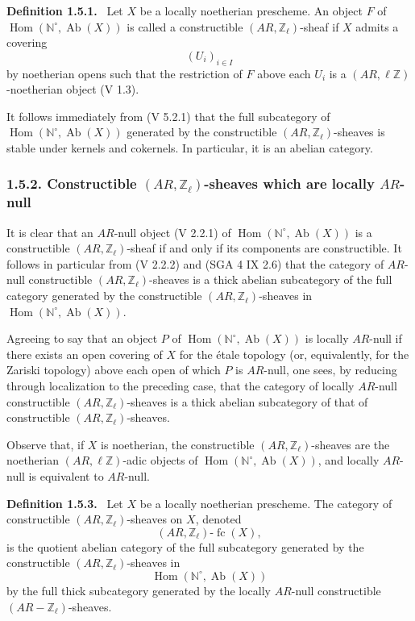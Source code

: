 \documentclass[11pt]{article}
\newenvironment{statement}[1]{\par\medskip\noindent\textbf{#1.}\ }{\par\medskip}
\DeclareMathOperator{\Hom}{Hom}
\providecommand{\Hom}{\operatorname{Hom}}
\providecommand{\Ab}{\operatorname{Ab}}
\providecommand{\fc}{\operatorname{fc}}
\providecommand{\Ab}{\operatorname{Ab}}
\begin{document}
\begin{statement}{Definition 1.5.1}
Let \(X\) be a locally noetherian prescheme. An object \(F\) of \(\Hom(\mathbb N^\circ,\Ab(X))\) is called a constructible \((AR,\mathbb Z_\ell)\)-sheaf if \(X\) admits a covering
\[
(U_i)_{i\in I}
\]
by noetherian opens such that the restriction of \(F\) above each \(U_i\) is a \((AR,\ell\mathbb Z)\)-noetherian object (V 1.3).
\end{statement}

It follows immediately from (V 5.2.1) that the full subcategory of \(\Hom(\mathbb N^\circ,\Ab(X))\) generated by the constructible \((AR,\mathbb Z_\ell)\)-sheaves is stable under kernels and cokernels. In particular, it is an abelian category.

\subsubsection*{1.5.2. Constructible \((AR,\mathbb Z_\ell)\)-sheaves which are locally \(AR\)-null}

It is clear that an \(AR\)-null object (V 2.2.1) of \(\Hom(\mathbb N^\circ,\Ab(X))\) is a constructible \((AR,\mathbb Z_\ell)\)-sheaf if and only if its components are constructible. It follows in particular from (V 2.2.2) and (SGA 4 IX 2.6) that the category of \(AR\)-null constructible \((AR,\mathbb Z_\ell)\)-sheaves is a thick abelian subcategory of the full category generated by the constructible \((AR,\mathbb Z_\ell)\)-sheaves in \(\Hom(\mathbb N^\circ,\Ab(X))\).

Agreeing to say that an object \(P\) of \(\Hom(\mathbb N^\circ,\Ab(X))\) is locally \(AR\)-null if there exists an open covering of \(X\) for the étale topology (or, equivalently, for the Zariski topology) above each open of which \(P\) is \(AR\)-null, one sees, by reducing through localization to the preceding case, that the category of locally \(AR\)-null constructible \((AR,\mathbb Z_\ell)\)-sheaves is a thick abelian subcategory of that of constructible \((AR,\mathbb Z_\ell)\)-sheaves.

Observe that, if \(X\) is noetherian, the constructible \((AR,\mathbb Z_\ell)\)-sheaves are the noetherian \((AR,\ell\mathbb Z)\)-adic objects of \(\Hom(\mathbb N^\circ,\Ab(X))\), and locally \(AR\)-null is equivalent to \(AR\)-null.

\begin{statement}{Definition 1.5.3}
Let \(X\) be a locally noetherian prescheme. The category of constructible \((AR,\mathbb Z_\ell)\)-sheaves on \(X\), denoted
\[
(AR,\mathbb Z_\ell)\text{-}\fc(X),
\]
is the quotient abelian category of the full subcategory generated by the constructible \((AR,\mathbb Z_\ell)\)-sheaves in
\[
\Hom(\mathbb N^\circ,\Ab(X))
\]
by the full thick subcategory generated by the locally \(AR\)-null constructible \((AR-\mathbb Z_\ell)\)-sheaves.
\end{statement}
\end{document}
